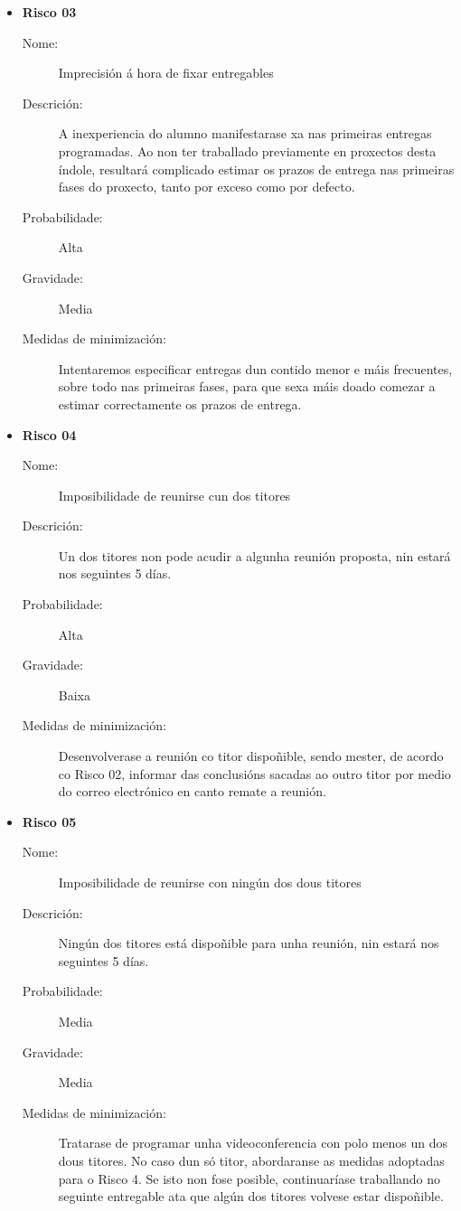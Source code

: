 \begin{itemize}
\item \textbf{Risco 03}
\begin{description}
\item[Nome:] Imprecisión á hora de fixar entregables
\item[Descrición:] A inexperiencia do alumno manifestarase xa nas primeiras entregas programadas. Ao non ter traballado previamente en proxectos desta índole, resultará complicado estimar os prazos de entrega nas primeiras fases do proxecto, tanto por exceso como por defecto.
\item[Probabilidade:] Alta
\item[Gravidade:] Media
\item[Medidas de minimización:] Intentaremos especificar entregas dun contido menor e máis frecuentes, sobre todo nas primeiras fases, para que sexa máis doado comezar a estimar correctamente os prazos de entrega.
\end{description}

\item \textbf{Risco 04}
\begin{description}
\item[Nome:] Imposibilidade de reunirse cun dos titores
\item[Descrición:] Un dos titores non pode acudir a algunha reunión proposta, nin estará nos seguintes 5 días.
\item[Probabilidade:] Alta
\item[Gravidade:] Baixa
\item[Medidas de minimización:] Desenvolverase a reunión co titor dispoñible, sendo mester, de acordo co Risco 02, informar das conclusións sacadas ao outro titor por medio do correo electrónico en canto remate a reunión.
\end{description}

\item \textbf{Risco 05}
\begin{description}
\item[Nome:] Imposibilidade de reunirse con ningún dos dous titores
\item[Descrición:] Ningún dos titores está dispoñible para unha reunión, nin estará nos seguintes 5 días.
\item[Probabilidade:] Media
\item[Gravidade:] Media
\item[Medidas de minimización:] Tratarase de programar unha videoconferencia con polo menos un dos dous titores. No caso dun só titor, abordaranse as medidas adoptadas para o Risco 4. Se isto non fose posible, continuaríase traballando no seguinte entregable ata que algún dos titores volvese estar dispoñible.
\end{description}


\end{itemize}
